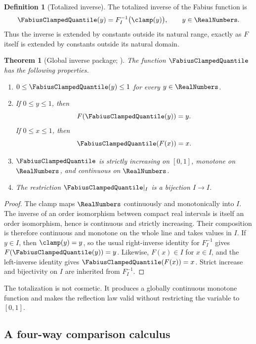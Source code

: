 \documentclass[11pt,oneside]{article}
\newtheorem{theorem}{Theorem}[section]
\theoremstyle{definition}
\newtheorem{definition}[definition]{Definition}
\theoremstyle{remark}
\begin{document}
\begin{definition}[Totalized inverse]
\label{inverse:def:totalized-inverse}
The totalized inverse of the Fabius function is
\[
 \FabiusClampedQuantile(y)=F_I^{-1}\bigl(\clamp(y)\bigr),\qquad y\in\RealNumbers.
\]
Thus the inverse is extended by constants outside its natural range,
exactly as $F$ itself is extended by constants outside its natural domain.
\end{definition}

\begin{theorem}[Global inverse package; \Formalized]
\label{inverse:thm:inverse-package}
The function $\FabiusClampedQuantile$ has the following properties.
\begin{enumerate}
\item $0\leq \FabiusClampedQuantile(y)\leq1$ for every $y\in\RealNumbers$.
\item If $0\leq y\leq1$, then
\[
 F(\FabiusClampedQuantile(y))=y.
\]
If $0\leq x\leq1$, then
\[
 \FabiusClampedQuantile(F(x))=x.
\]
\item $\FabiusClampedQuantile$ is strictly increasing on $[0,1]$, monotone on $\RealNumbers$, and
continuous on $\RealNumbers$.
\item The restriction $\FabiusClampedQuantile|_I$ is a bijection $I\to I$.
\end{enumerate}
\end{theorem}

\begin{proof}
The clamp maps $\RealNumbers$ continuously and monotonically into $I$.  The inverse
of an order isomorphism between compact real intervals is itself an order
isomorphism, hence is continuous and strictly increasing.  Their
composition is therefore continuous and monotone on the whole line and
takes values in $I$.  If $y\in I$, then $\clamp(y)=y$, so the usual
right-inverse identity for $F_I^{-1}$ gives $F(\FabiusClampedQuantile(y))=y$.  Likewise,
$F(x)\in I$ for $x\in I$, and the left-inverse identity gives
$\FabiusClampedQuantile(F(x))=x$.  Strict increase and bijectivity on $I$ are inherited
from $F_I^{-1}$.
\end{proof}

The totalization is not cosmetic.  It produces a globally continuous
monotone function and makes the reflection law valid without restricting
the variable to $[0,1]$.

\subsection{A four-way comparison calculus}
\end{document}
